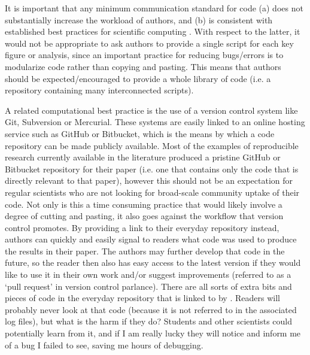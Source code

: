 It is important that any minimum communication standard for code (a) does not substantially increase the workload of authors, and (b) is consistent with established best practices for scientific computing \citep{Wilson2014a}. With respect to the latter, it would not be appropriate to ask authors to provide a single script for each key figure or analysis, since an important practice for reducing bugs/errors is to modularize code rather than copying and pasting. This means that authors should be expected/encouraged to provide a whole library of code (i.e. a repository containing many interconnected scripts).

A related computational best practice is the use of a version control system like Git, Subversion or Mercurial. These systems are easily linked to an online hosting service such as GitHub or Bitbucket, which is the means by which a code repository can be made publicly available. Most of the examples of reproducible research currently available in the literature produced a pristine GitHub or Bitbucket repository for their paper (i.e. one that contains only the code that is directly relevant to that paper), however this should not be an expectation for regular scientists who are not looking for broad-scale community uptake of their code. Not only is this a time consuming practice that would likely involve a degree of cutting and pasting, it also goes against the workflow that version control promotes. By providing a link to their everyday repository instead, authors can quickly and easily signal to readers what code was used to produce the results in their paper. The authors may further develop that code in the future, so the reader then also has easy access to the latest version if they would like to use it in their own work and/or suggest improvements (referred to as a `pull request' in version control parlance). There are all sorts of extra bits and pieces of code in the everyday repository that is linked to by \citet{Irving2015}. Readers will probably never look at that code (because it is not referred to in the associated log files), but what is the harm if they do? Students and other scientists could potentially learn from it, and if I am really lucky they will notice and inform me of a bug I failed to see, saving me hours of debugging.       

